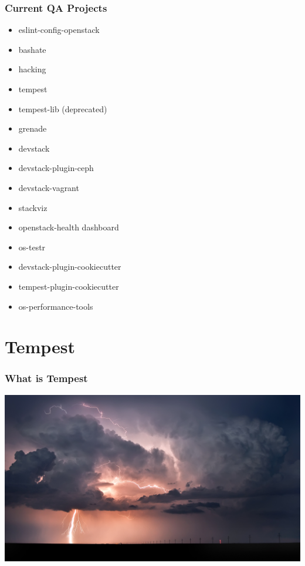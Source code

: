 \documentclass[aspectratio=169,11pt,hyperref={colorlinks=true}]{beamer}
\begin{document}
\begin{frame}
    \frametitle{Current QA Projects}
    \begin{itemize}
        \item{eslint-config-openstack}
        \item{bashate}
        \item{hacking}
        \item{tempest}
        \item{tempest-lib (deprecated)}
        \item{grenade}
        \item{devstack}
        \item{devstack-plugin-ceph}
        \item{devstack-vagrant}
        \item{stackviz}
        \item{openstack-health dashboard}
        \item{os-testr}
        \item{devstack-plugin-cookiecutter}
        \item{tempest-plugin-cookiecutter}
        \item{os-performance-tools}
    \end{itemize}
\end{frame}

\section{Tempest}
\begin{frame}[c]
    \frametitle{What is Tempest}
    \begin{center}
    	\includegraphics[width=1.0\textwidth]{tempest.jpg}
    \end{center}
\end{frame}
\end{document}
